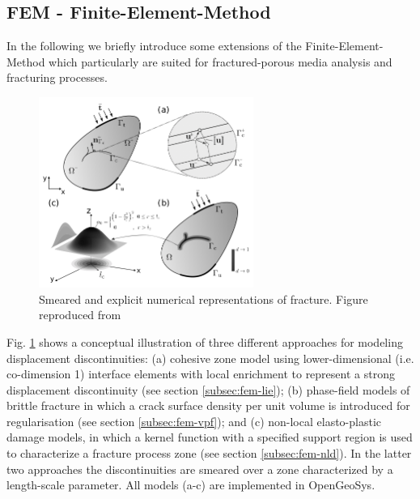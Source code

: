 \subsection*{FEM - Finite-Element-Method}
In the following we briefly introduce some extensions of the Finite-Element-Method which particularly are suited for fractured-porous media analysis and fracturing processes.

\label{subsec:fem-lie}


\label{subsec:fem-vpf}

\label{subsec:fem-nld}
\clearpage
\begin{figure}
\centering
\includegraphics[width=7cm]{figures/Schematic_figure_LIE_PF_NLD}
\caption{Smeared and explicit numerical representations of fracture. Figure reproduced from~\cite{Yoshioka2019}}
\label{fig:ogsfem-overview}
\end{figure}
Fig. \ref{fig:ogsfem-overview} shows a conceptual illustration of three different approaches for modeling displacement discontinuities: (a) cohesive zone model using lower-dimensional (i.e. co-dimension 1) interface elements with local enrichment to represent a strong displacement discontinuity (see section \ref{subsec:fem-lie}); (b) phase-field models of brittle fracture in which a crack surface density per unit volume is introduced for regularisation (see section \ref{subsec:fem-vpf}); and (c) non-local elasto-plastic damage models, in which a kernel function with a specified support region is used to characterize a fracture process zone (see section \ref{subsec:fem-nld}). In the latter two approaches the discontinuities are smeared over a zone characterized by a length-scale parameter. All models (a-c) are implemented in OpenGeoSys.